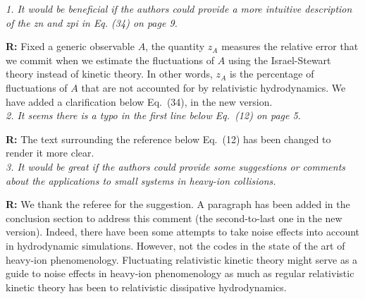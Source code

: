 \documentclass[preprint]{revtex4-1}
\begin{document}
\textit{1. It would be beneficial if the authors could provide a more intuitive description of the zn and zpi in Eq. (34) on page 9.
}

\textbf{R:} Fixed a generic observable $A$, the quantity $z_A$ measures the relative error that we commit when we estimate the fluctuations of $A$ using the Israel-Stewart theory instead of kinetic theory. In other words, $z_A$ is the percentage of fluctuations of $A$ that are not accounted for by relativistic hydrodynamics. We have added a clarification below Eq.~(34), in the new version.\\



\textit{2. It seems there is a typo in the first line below Eq.~(12) on page 5.
}

\textbf{R:} The text surrounding the reference below Eq.~(12) has been changed to render it more clear.\\

\textit{3. It would be great if the authors could provide some suggestions or
comments about the applications to small systems in heavy-ion collisions.}

\textbf{R:} We thank the referee for the suggestion. A paragraph has been added in the conclusion section to address this comment (the second-to-last one in the new version). Indeed, there have been some attempts to take noise effects into account in hydrodynamic simulations. However, not the codes in the state of the art of heavy-ion phenomenology. Fluctuating relativistic kinetic theory might serve as a guide to noise effects in heavy-ion phenomenology as much as regular relativistic kinetic theory has been to relativistic dissipative hydrodynamics.  
\end{document}
